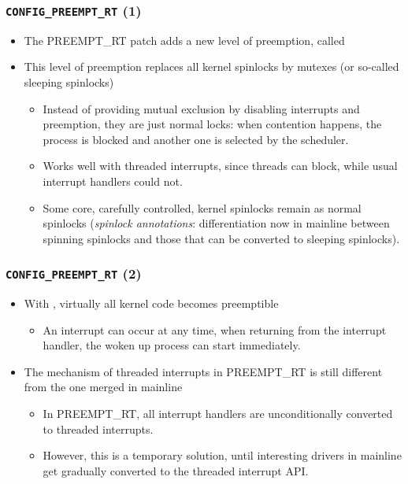 \begin{frame}
  \frametitle{{\tt CONFIG\_PREEMPT\_RT} (1)}
  \begin{itemize}
  \item The PREEMPT\_RT patch adds a new level of preemption, called
  \item This level of preemption replaces all kernel spinlocks by
    mutexes (or so-called sleeping spinlocks)
    \begin{itemize}
    \item Instead of providing mutual exclusion by disabling
      interrupts and preemption, they are just normal locks: when
      contention happens, the process is blocked and another one is
      selected by the scheduler.
    \item Works well with threaded interrupts, since threads can
      block, while usual interrupt handlers could not.
    \item Some core, carefully controlled, kernel spinlocks remain as
      normal spinlocks ({\em spinlock annotations}: differentiation
      now in mainline between spinning spinlocks and those that can be
      converted to sleeping spinlocks).
    \end{itemize}
  \end{itemize}
\end{frame}

\begin{frame}
  \frametitle{{\tt CONFIG\_PREEMPT\_RT} (2)}
  \begin{itemize}
  \item With , virtually all kernel code
    becomes preemptible
    \begin{itemize}
    \item An interrupt can occur at any time, when returning from the
      interrupt handler, the woken up process can start immediately.
    \end{itemize}
  \item The mechanism of threaded interrupts in PREEMPT\_RT is still
    different from the one merged in mainline
    \begin{itemize}
      \item In PREEMPT\_RT, all interrupt handlers are unconditionally
        converted to threaded interrupts.
      \item However, this is a temporary solution, until interesting drivers in
    	mainline get gradually converted to the threaded interrupt API.
    \end{itemize}
  \end{itemize}
\end{frame}

